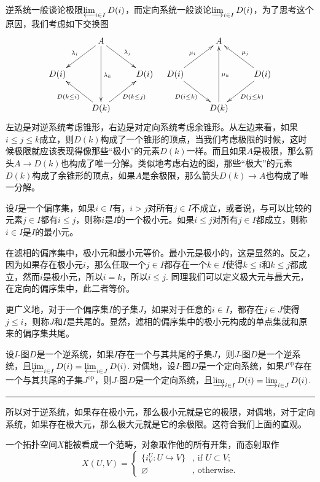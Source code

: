 逆系统一般谈论极限$\varprojlim_{i\in I} D(i)$，而定向系统一般谈论$\varinjlim_{i\in I} D(i)$，为了思考这个原因，我们考虑如下交换图
\[
	\xymatrix{
		&A \ar[dl]_{\lambda_{i}}\ar[dr]^{\lambda_{j}}\ar[dd]^{\lambda_{k}}&\\
		D(i)&&D(i)\\
		&D(k)\ar[ul]^{D(k\leq i)}\ar[ur]_{D(k\leq j)}&
	}
	\quad
	\xymatrix{
		&A &\\
		\ar[ur]^{\mu_{i}}D(i)\ar[dr]_{D(i\leq k)}&&D(i)\ar[ul]_{\mu_{j}}\ar[dl]^{D(j\leq k)}\\
		&D(k)\ar[uu]_{\mu_{k}}&
	}
\]
左边是对逆系统考虑锥形，右边是对定向系统考虑余锥形。从左边来看，如果$i\leq j\leq k$成立，则$D(k)$构成了一个锥形的顶点，当我们考虑极限的时候，这时候极限就应该表现得像那些“极小”的元素$D(k)$一样。而且如果$A$是极限，那么箭头$A\to D(k)$也构成了唯一分解。类似地考虑右边的图，那些“极大”的元素$D(k)$构成了余锥形的顶点，如果$A$是余极限，那么箭头$D(k)\to A$也构成了唯一分解。

\para 设$I$是一个偏序集，如果$i\in I$有，$i>j$对所有$j\in I$不成立，或者说，与可以比较的元素$j\in I$都有$i\leq j$，则称$i$是$I$的一个极小元。如果$i\leq j$对所有$j\in I$都成立，则称$i\in I$是$I$的最小元。

在滤相的偏序集中，极小元和最小元等价。最小元是极小的，这是显然的。反之，因为如果存在极小元$i$，那么任取一个$j\in I$都存在一个$k\in I$使得$k\leq i$和$k\leq j$都成立，然而$i$是极小元，所以$i=k$，所以$i\leq j$. 同理我们可以定义极大元与最大元，在定向的偏序集中，此二者等价。

更广义地，对于一个偏序集$I$的子集$J$，如果对于任意的$i\in I$，都存在$j\in J$使得$j\leq i$，则称$J$和$I$是共尾的。显然，滤相的偏序集中的极小元构成的单点集就和原来的偏序集共尾。

\pro 设$I$-图$D$是一个逆系统，如果$I$存在一个与其共尾的子集$J$，则$J$-图$D$是一个逆系统，且$\varprojlim_{i\in I} D(i)=\varprojlim_{i\in J} D(i)$. 对偶地，设$I$-图$D$是一个定向系统，如果$I^{\mathrm{op}} $存在一个与其共尾的子集$J^{\mathrm{op}} $，则$J$-图$D$是一个定向系统，且$\varinjlim_{i\in I} D(i)=\varinjlim_{i\in J} D(i)$. \rule{2mm}{2mm}

所以对于逆系统，如果存在极小元，那么极小元就是它的极限，对偶地，对于定向系统，如果存在极大元，那么极大元就是它的余极限。这符合我们上面的直观。

\para 一个拓扑空间$X$能被看成一个范畴，对象取作他的所有开集，而态射取作
\[
	{X}(U,V)=\begin{cases}
	\bigl\{i^U_V:U\hookrightarrow V\bigr\}&\text{, if }U\subset V\text{;}\\
	\varnothing&\text{, otherwise}.
	\end{cases}
\]

